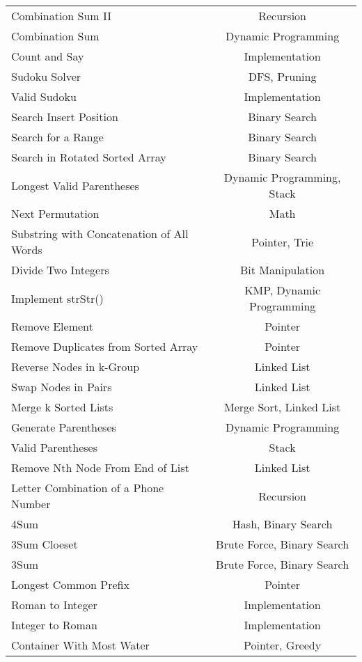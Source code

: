 \documentclass[paper=a4, fontsize=11pt]{scrartcl} %
\begin{document}
\begin{center}
\begin{longtable}{|l|c|}
    Combination Sum II  &   Recursion  \\
    Combination Sum &   Dynamic Programming \\
    Count and Say   &   Implementation  \\
    Sudoku Solver   &   DFS, Pruning \\
    Valid Sudoku    &   Implementation \\
    Search Insert Position  &   Binary Search   \\
    Search for a Range  &   Binary Search   \\
    Search in Rotated Sorted Array  &   Binary Search   \\
    Longest Valid Parentheses   &   Dynamic Programming, Stack   \\
    Next Permutation    &   Math    \\
    Substring with Concatenation of All Words   &   Pointer, Trie \\
    Divide Two Integers &   Bit Manipulation    \\
    Implement strStr()  &   KMP, Dynamic Programming  \\
    Remove Element  &   Pointer \\
    Remove Duplicates from Sorted Array &   Pointer \\
    Reverse Nodes in k-Group    &   Linked List \\
    Swap Nodes in Pairs     &   Linked List \\
    Merge k Sorted Lists    &   Merge Sort, Linked List\\
    Generate Parentheses    &   Dynamic Programming \\
    Valid Parentheses   &   Stack   \\
    Remove Nth Node From End of List    &   Linked List \\
    Letter Combination of a Phone Number    &   Recursion \\
    4Sum    &   Hash, Binary Search \\
    3Sum Cloeset    &   Brute Force, Binary Search \\
    3Sum    &   Brute Force, Binary Search \\
    Longest Common Prefix   &   Pointer \\
    Roman to Integer    &   Implementation  \\
    Integer to Roman    &   Implementation  \\
    Container With Most Water   &   Pointer, Greedy\\

\end{longtable}
\end{center}
\end{document}
